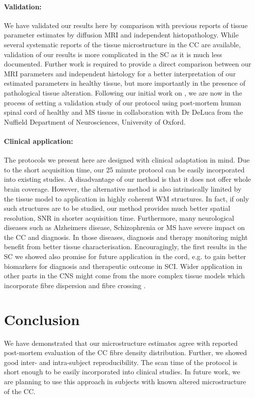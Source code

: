 \paragraph{Validation: } We have validated our results here by comparison with previous reports of tissue parameter estimates by diffusion MRI and independent histopathology. While several systematic reports of the tissue microstructure in the \gls{CC} are available, validation of our results is more complicated in the SC as it is much less documented. Further work is required to provide a direct comparison between our MRI parameters and independent histology for a better interpretation of our estimated parameters in healthy tissue, but more importantly in the presence of pathological tissue alteration. Following our initial work on \SFasym{}, we are now in the process of setting a validation study of our protocol using post-mortem human spinal cord of healthy and MS tissue in collaboration with Dr DeLuca from the Nuffield Department of Neurosciences, University of Oxford.

\paragraph{Clinical application: } The protocols we present here are designed with clinical adaptation in mind. Due to the short acquisition time, our 25 minute protocol can be easily incorporated into existing studies. A disadvantage of our method is that it does not offer whole brain coverage. However, the alternative \OI{} method is also intrinsically limited by the tissue model to application in highly coherent WM structures. In fact, if only such structures are to be studied, our method provides much better spatial resolution, \gls{SNR} in shorter acquisition time. Furthermore, many neurological diseases such as Alzheimers disease, Schizophrenia or MS have severe impact on the \gls{CC} and diagnosis. In those diseases, diagnosis and therapy monitoring might benefit from better tissue characterisation. Encouragingly, the first results in the SC we showed also promise for future application in the cord, e.g. to gain better biomarkers for diagnosis and therapeutic outcome in SCI. Wider application in other parts in the CNS might come from the more complex tissue models which incorporate fibre dispersion and fibre crossing \citep{Zhang:2011}.

\section{Conclusion}
We have demonstrated that our microstructure estimates agree with reported post-mortem evaluation of the \gls{CC} fibre density distribution. Further, we showed good inter- and intra-subject reproducibility. The scan time of the protocol is short enough to be easily incorporated into clinical studies. In future work, we are planning to use this approach in subjects with known altered microstructure of the \gls{CC}.